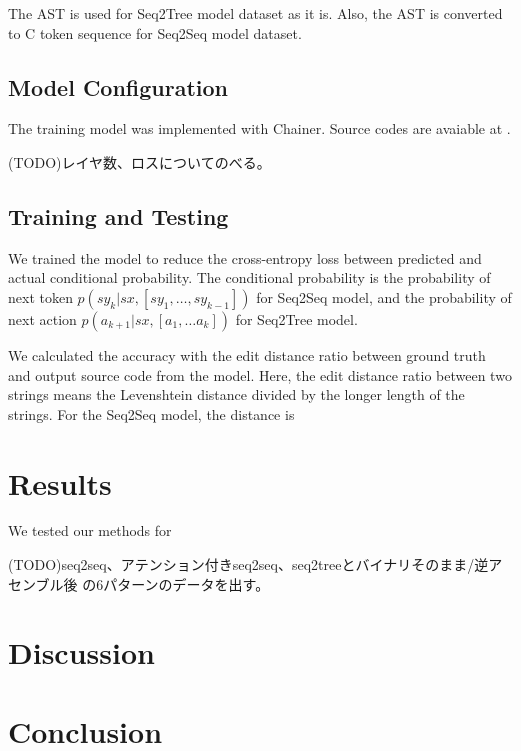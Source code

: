 \documentclass[senior,final,11pt]{iscs-thesis}
\begin{document}
The AST is used for Seq2Tree model dataset as it is.
Also, the AST is converted to C token sequence for Seq2Seq model dataset. 


\section{Model Configuration}
The training model was implemented with Chainer. Source codes are avaiable at \url{}.


(TODO)レイヤ数、ロスについてのべる。

\section{Training and Testing}

We trained the model to reduce the cross-entropy loss between predicted and actual conditional probability.
The conditional probability is the probability of next token $ p(sy_k|sx,[sy_1,\dots,sy_{k-1}]) $ for Seq2Seq model, 
and the probability of next action $p(a_{k+1}|sx,[a_1, \dots a_{k}]) $ for Seq2Tree model.

We calculated the accuracy with the edit distance ratio between ground truth and output source code from the model.
Here, the edit distance ratio between two strings means the Levenshtein distance divided by the longer length of the strings.
For the Seq2Seq model, the distance is 

\chapter{Results}

We tested our methods for 


(TODO)seq2seq、アテンション付きseq2seq、seq2treeとバイナリそのまま/逆アセンブル後 の6パターンのデータを出す。
\chapter{Discussion}
\chapter{Conclusion}



\end{document}
